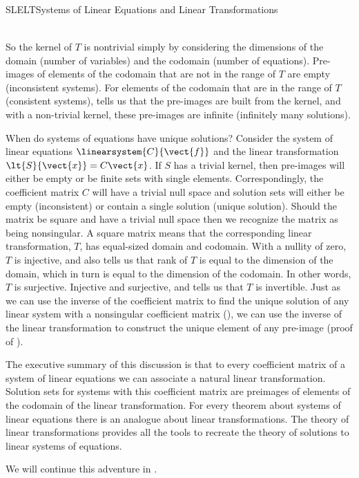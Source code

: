 \begin{subsect}{SLELT}{Systems of Linear Equations and Linear Transformations}
\begin{para}
\begin{align*}
\end{align*}
\end{para}
%
\begin{para}So the kernel of $T$ is nontrivial simply by considering the dimensions of the domain (number of variables) and the codomain (number of equations).  Pre-images of elements of the codomain that are not in the range of $T$ are empty (inconsistent systems).  For elements of the codomain that are in the range of $T$ (consistent systems),  tells us that the pre-images are built from the kernel, and with a non-trivial kernel, these pre-images are infinite (infinitely many solutions).\end{para}
%
\begin{para}When do systems of equations have unique solutions?  Consider the system of linear equations $\linearsystem{C}{\vect{f}}$ and the linear transformation $\lt{S}{\vect{x}}=C\vect{x}$.  If $S$ has a trivial kernel, then pre-images will either be empty or be finite sets with single elements.  Correspondingly, the coefficient matrix $C$ will have a trivial null space and solution sets will either be empty (inconsistent) or contain a single solution (unique solution).  Should the matrix be square and have a trivial null space then we recognize the matrix as being nonsingular.  A square matrix means that the corresponding linear transformation, $T$, has equal-sized domain and codomain.  With a nullity of zero, $T$ is injective, and also  tells us that rank of $T$ is equal to the dimension of the domain, which in turn is equal to the dimension of the codomain.  In other words, $T$ is surjective.  Injective and surjective, and  tells us that $T$ is invertible.  Just as we can use the inverse of the coefficient matrix to find the unique solution of any linear system with a nonsingular coefficient matrix (), we can use the inverse of the linear transformation to construct the unique element of any pre-image (proof of ).\end{para}
%
\begin{para}The executive summary of this discussion is that to every coefficient matrix of a system of linear equations we can associate a natural linear transformation.  Solution sets for systems with this coefficient matrix are preimages of elements of the codomain of the linear transformation.  For every theorem about systems of linear equations there is an analogue about linear transformations.  The theory of linear transformations provides all the tools to recreate the theory of solutions to linear systems of equations.\end{para}
%
\begin{para}We will continue this adventure in .\end{para}
%
%
\end{subsect}
%
